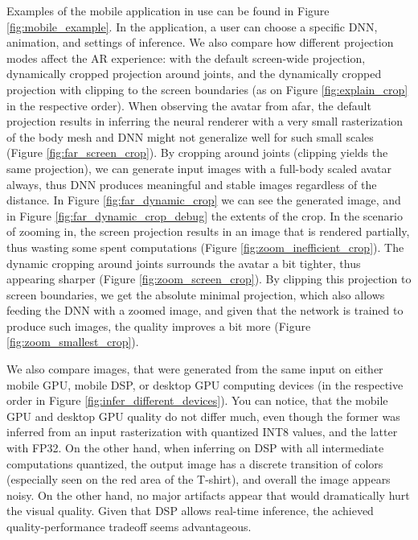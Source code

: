 Examples of the mobile application in use can be found in Figure \ref{fig:mobile_example}. In the application, a user can choose a specific DNN, animation, and settings of inference. We also compare how different projection modes affect the AR experience: with the default screen-wide projection, dynamically cropped projection around joints, and the dynamically cropped projection with clipping to the screen boundaries (as on Figure \ref{fig:explain_crop} in the respective order). When observing the avatar from afar, the default projection results in inferring the neural renderer with a very small rasterization of the body mesh and DNN might not generalize well for such small scales (Figure \ref{fig:far_screen_crop}). By cropping around joints (clipping yields the same projection), we can generate input images with a full-body scaled avatar always, thus DNN produces meaningful and stable images regardless of the distance. In Figure \ref{fig:far_dynamic_crop} we can see the generated image, and in Figure \ref{fig:far_dynamic_crop_debug} the extents of the crop. In the scenario of zooming in, the screen projection results in an image that is rendered partially, thus wasting some spent computations (Figure \ref{fig:zoom_inefficient_crop}). The dynamic cropping around joints surrounds the avatar a bit tighter, thus appearing sharper (Figure \ref{fig:zoom_screen_crop}). By clipping this projection to screen boundaries, we get the absolute minimal projection, which also allows feeding the DNN with a zoomed image, and given  that the network is trained to produce such images, the quality improves a bit more (Figure \ref{fig:zoom_smallest_crop}).

We also compare images, that were generated from the same input on either mobile GPU, mobile DSP, or desktop GPU computing devices (in the respective order in Figure \ref{fig:infer_different_devices}). You can notice, that the mobile GPU and desktop GPU quality do not differ much, even though the former was inferred from an input rasterization with quantized INT8 values, and the latter with FP32. On the other hand, when inferring on DSP with all intermediate computations quantized, the output image has a discrete transition of colors (especially seen on the red area of the T-shirt), and overall the image appears noisy. On the other hand, no major artifacts appear that would dramatically hurt the visual quality. Given that DSP allows real-time inference, the achieved quality-performance tradeoff seems advantageous.

